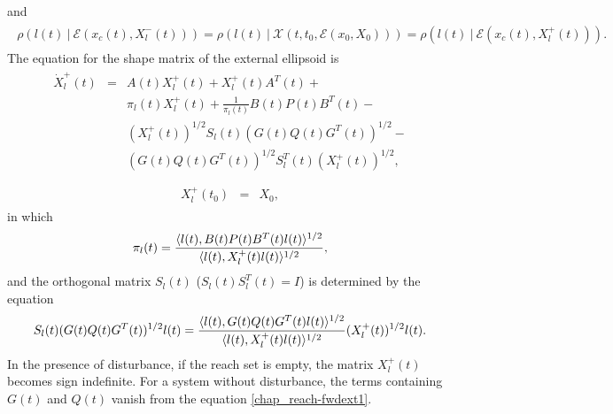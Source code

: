 \documentclass[letterpaper,10pt,english]{sphinxmanual}
\begin{document}
and
\label{chap_reach:equation-fwdtightness}\begin{gather}
\begin{split}\rho(l(t) ~|~ {\mathcal E}(x_c(t), X^-_l(t))) =
\rho(l(t) ~|~ {\mathcal X}(t, t_0, {\mathcal E}(x_0,X_0))) =
\rho(l(t) ~|~ {\mathcal E}(x_c(t), X^+_l(t))) .\end{split}\label{chap_reach-fwdtightness}
\end{gather}
The equation for the shape matrix of the external ellipsoid is
\label{chap_reach:equation-fwdext1}\begin{gather}
\begin{split}\dot{X}^+_l(t) & = & A(t)X^+_l(t) + X^+_l(t)A^T(t) +\nonumber \\
& & \pi_l(t)X^+_l(t) + \frac{1}{\pi_l(t)}B(t)P(t)B^T(t) -\nonumber \\
& & (X_l^{+}(t))^{1/2}S_l(t)(G(t)Q(t)G^T(t))^{1/2} \nonumber -\\
& & (G(t)Q(t)G^T(t))^{1/2}S_l^T(t)(X_l^{+}(t))^{1/2}, \\\end{split}\label{chap_reach-fwdext1}
\end{gather}\label{chap_reach:equation-fwdext2}\begin{gather}
\begin{split}X^+_l(t_0) & = & X_0,\end{split}\label{chap_reach-fwdext2}
\end{gather}
in which
\begin{gather}
\begin{split}\pi_l(t) = \frac{\langle l(t),
B(t)P(t)B^T(t)l(t)\rangle^{1/2}}{\langle l(t), X^+_l(t)l(t)\rangle^{1/2}},\end{split}\notag
\end{gather}
and the orthogonal matrix $S_l(t)$ ($S_l(t)S_l^T(t) = I$)
is determined by the equation
\begin{gather}
\begin{split}S_l(t)(G(t)Q(t)G^T(t))^{1/2}l(t) = \frac{\langle l(t),
G(t)Q(t)G^T(t)l(t)\rangle^{1/2}}{\langle l(t),
X_l^+(t)l(t)\rangle^{1/2}}(X_l^{+}(t))^{1/2}l(t).\end{split}\notag
\end{gather}
In the presence of disturbance, if the reach set is empty, the matrix
$X^+_l(t)$ becomes sign indefinite. For a system without
disturbance, the terms containing $G(t)$ and $Q(t)$ vanish
from the equation \eqref{chap_reach-fwdext1}.
\end{document}
